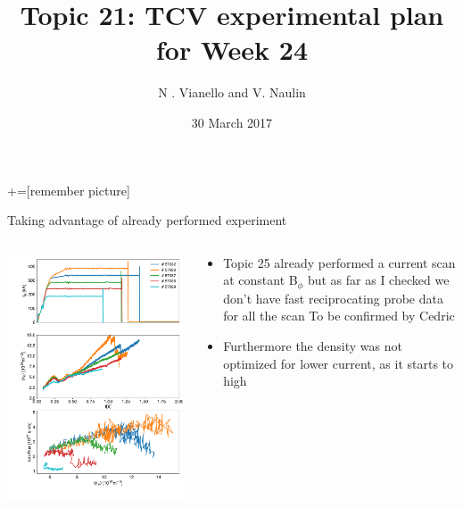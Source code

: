 \documentclass[10pt, compress]{beamer}
\title{Topic 21: TCV experimental plan for Week 24}
\date{30 March 2017}
\author[N. Vianello,  V. Naulin]{N . Vianello and V. Naulin}
\newcommand\Fontvi{\fontsize{8}{7.2}\selectfont}
\begin{document}
+=[remember picture]
\maketitle

\begin{frame}{Taking advantage of already performed experiment}
\vspace{-1cm}
\Fontvi
  \begin{columns}
    \begin{column}{0.6\textwidth}
      \includegraphics[width=\textwidth]{../../Experiments/TCV/analysis/pdfbox/CurrentScanTopic25}
    \end{column}
    \begin{column}{0.4\textwidth}
      \begin{itemize}
        \item Topic 25 already performed a current scan at
          constant B$_{\phi}$ but as far as I checked we don't have
          fast reciprocating probe data for all the scan \alert{To be
            confirmed by Cedric}
        \item Furthermore the density was not optimized for lower
          current, as it starts to high
      \end{itemize}
    \end{column}
  \end{columns}
\end{frame}
\end{document}

